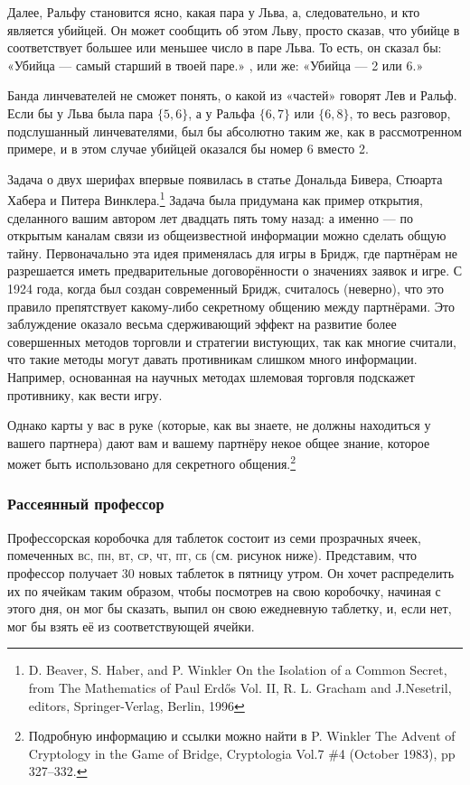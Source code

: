 Далее, Ральфу становится ясно, какая пара у Льва, а, следовательно, и кто является убийцей.
Он может сообщить об этом Льву, просто сказав, что убийце в соответствует большее или меньшее число в паре Льва.
То есть, он сказал бы: «Убийца --- самый старший в твоей паре.» , или же: «Убийца --- 2 или 6.»

Банда линчевателей не сможет понять, о какой из «частей» говорят Лев и Ральф.
Если бы у Льва была пара $\{5,6\}$, а у Ральфа $\{6,7\}$ или $\{6,8\}$, то весь разговор, подслушанный линчевателями, был бы абсолютно таким же, как в рассмотренном примере, и в этом случае убийцей оказался бы номер 6 вместо 2.
\heart

Задача о двух шерифах впервые появилась в статье Дональда Бивера, Стюарта Хабера и Питера Винклера.\footnote{D.
Beaver, S. Haber, and P. Winkler On the Isolation of a Common Secret, from The Mathematics of Paul Erd\H{o}s Vol. II, R. L. Gracham and J.Nesetril, editors, Springer-Verlag, Berlin, 1996} Задача была придумана как пример открытия, сделанного вашим автором лет двадцать пять тому назад: а именно --- по открытым каналам связи из общеизвестной информации можно сделать общую тайну.
Первоначально эта идея применялась для игры в Бридж, где партнёрам не разрешается иметь предварительные договорённости о значениях заявок и игре.
С 1924 года, когда был создан современный Бридж, считалось (неверно), что это правило препятствует какому-либо секретному общению между партнёрами.
Это заблуждение оказало весьма сдерживающий эффект на развитие более совершенных методов торговли и стратегии вистующих, так как многие считали, что такие методы могут давать противникам слишком много информации.
Например, основанная на научных методах шлемовая торговля подскажет противнику, как вести игру.

Однако карты у вас в руке (которые, как вы знаете, не должны находиться у вашего партнера) дают вам и вашему партнёру некое общее знание, которое может быть использовано для секретного общения.\footnote{
Подробную информацию и ссылки можно найти в P. Winkler The Advent of Cryptology in the Game of Bridge, Cryptologia Vol.7 \#4 (October 1983), pp 327--332.}

\subsubsection*{Рассеянный профессор}%

Профессорская коробочка для таблеток состоит из семи прозрачных ячеек, помеченных \textsc{вс}, \textsc{пн}, \textsc{вт}, \textsc{ср}, \textsc{чт}, \textsc{пт}, \textsc{сб} (см. рисунок ниже).
Представим, что профессор получает 30 новых таблеток в пятницу утром.
Он хочет распределить их по ячейкам таким образом, чтобы посмотрев на свою коробочку, начиная с этого дня, он мог бы сказать, выпил он свою ежедневную таблетку, и, если нет, мог бы взять её из соответствующей ячейки.

